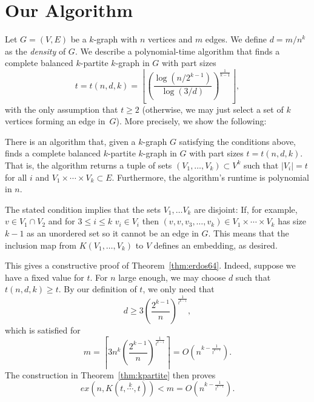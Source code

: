 \section{Our Algorithm}\label{sec:algorithm}
Let $G = (V, E)$ be a $k$-graph with $n$ vertices and $m$ edges.
We define $d = m/n^k$ as the \emph{density} of $G$.
We describe a polynomial-time algorithm that finds a complete balanced $k$-partite $k$-graph in $G$ with part
sizes
\begin{equation}
     t = t (n, d, k) = \left\lfloor
        \left(  \frac{\log (n/2^{k-1})}{\log (3/d)} \right)
        ^{\frac{1}{k-1}} \right\rfloor \label{eq:t},
\end{equation}
with the only assumption that $t \geq 2$ (otherwise, we may just select a set of $k$ vertices forming an edge in~$G$).
More precisely, we show the following:
\begin{theorem}\label{thm:kpartite}
    There is an algorithm that, given a $k$-graph $G$ satisfying the conditions above,
    finds a complete balanced $k$-partite $k$-graph in $G$ with part sizes $t = t(n, d, k)$.
    That is, the algorithm returns a tuple of sets $(V_1, \ldots, V_k) \subset V^k$ such that
    $|V_i| = t$ for all $i$ and $V_1 \times \cdots \times V_k \subset E$.
    Furthermore, the algorithm's runtime is polynomial in $n$.
\end{theorem}

\begin{remark}
    The stated condition implies that the sets $V_1, \dots V_k$ are disjoint:
    If, for example, $v \in V_1 \cap V_2$ and for $3 \leq i \leq k$ $v_i \in V_i$ then
    $(v, v, v_3, \dots, v_k) \in V_1 \times \cdots \times V_k$ has size $k-1$ as an unordered set so it cannot
    be an edge in $G$.
    This means that the inclusion map from $K(V_1, \dots, V_k)$ to $V$ defines an embedding, as desired.
\end{remark}

This gives a constructive proof of Theorem~\ref{thm:erdos64}.
Indeed, suppose we have a fixed value for $t$.
For $n$ large enough, we may choose $d$ such that $t(n, d, k) \geq t$.
By our definition of $t$, we only need that
\[
    d \geq 3 {\left( \frac{2^{k-1}}{n}\right)}^{\frac{1}{t^{k-1}}},
\]
which is satisfied for
\[
    m =
    \left\lceil
    3 n^k {\left( \frac{2^{k-1}}{n}\right)}^{\frac{1}{t^{k-1}}}
    \right\rceil =
    O\left(n^{k - \frac{1}{t^{k-1}}}\right).
\]
The construction in Theorem~\ref{thm:kpartite} then proves
\[
    ex(n, K(t, \overset{k}{\cdots}, t)) < m =  O\left(n^{k - \frac{1}{t^{k-1}}}\right).
\]

